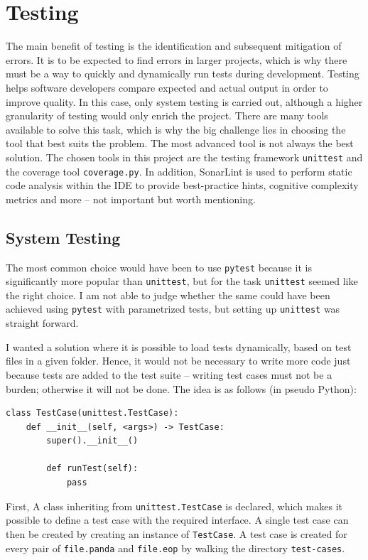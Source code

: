 \chapter{Testing}
The main benefit of testing is the identification and subsequent mitigation of errors. It is to be expected to find errors in larger projects, which is why there must be a way to quickly and dynamically run tests during development. Testing helps software developers compare expected and actual output in order to improve quality. In this case, only system testing is carried out, although a higher granularity of testing would only enrich the project. There are many tools available to solve this task, which is why the big challenge lies in choosing the tool that best suits the problem. The most advanced tool is not always the best solution. The chosen tools in this project are the testing framework \texttt{unittest} and the coverage tool \texttt{coverage.py}. In addition, SonarLint is used to perform static code analysis within the IDE to provide best-practice hints, cognitive complexity metrics and more -- not important but worth mentioning.

\section{System Testing}
The most common choice would have been to use \texttt{pytest} because it is significantly more popular than \texttt{unittest}, but for the task \texttt{unittest} seemed like the right choice. I am not able to judge whether the same could have been achieved using \texttt{pytest} with parametrized tests, but setting up \texttt{unittest} was straight forward.

I wanted a solution where it is possible to load tests dynamically, based on test files in a given folder. Hence, it would not be necessary to write more code just because tests are added to the test suite -- writing test cases must not be a burden; otherwise it will not be done. The idea is as follows (in pseudo Python):

\begin{verbatim}
class TestCase(unittest.TestCase):
    def __init__(self, <args>) -> TestCase:
        super().__init__()

        def runTest(self):
            pass
\end{verbatim}

First, A class inheriting from \texttt{unittest.TestCase} is declared, which makes it possible to define a test case with the required interface. A single test case can then be created by creating an instance of \texttt{TestCase}. A test case is created for every pair of \texttt{file.panda} and \texttt{file.eop} by walking the directory \texttt{test-cases}.

